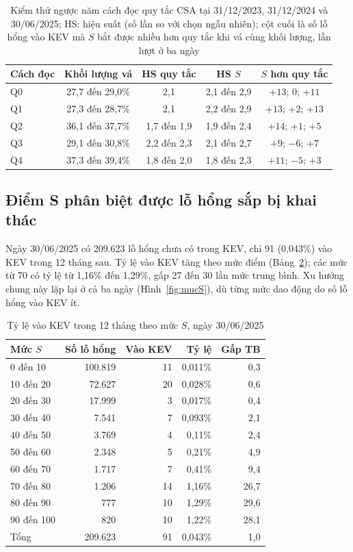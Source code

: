 \documentclass[conference]{IEEEtran}
\begin{document}
\begin{table}[htbp]
\caption{Kiểm thử ngược năm cách đọc quy tắc CSA tại 31/12/2023, 31/12/2024 và 30/06/2025; HS:
hiệu suất (số lần so với chọn ngẫu nhiên); cột cuối là số lỗ hổng vào KEV mà $S$ bắt được nhiều
hơn quy tắc khi vá cùng khối lượng, lần lượt ở ba ngày}\label{tab:donhay2}
\centering
\footnotesize
\setlength{\tabcolsep}{2.5pt}
\begin{tabular}{lcccc}
\toprule
Cách đọc & Khối lượng vá & HS quy tắc & HS $S$ & $S$ hơn quy tắc \\
\midrule
Q0 & 27,7 đến 29,0\% & 2,1 & 2,1 đến 2,9 & $+13$; $0$; $+11$ \\
Q1 & 27,3 đến 28,7\% & 2,1 & 2,2 đến 2,9 & $+13$; $+2$; $+13$ \\
Q2 & 36,1 đến 37,7\% & 1,7 đến 1,9 & 1,9 đến 2,4 & $+14$; $+1$; $+5$ \\
Q3 & 29,1 đến 30,8\% & 2,2 đến 2,3 & 2,1 đến 2,7 & $+9$; $-6$; $+7$ \\
Q4 & 37,3 đến 39,4\% & 1,8 đến 2,0 & 1,8 đến 2,3 & $+11$; $-5$; $+3$ \\
\bottomrule
\end{tabular}
\end{table}

\subsection{Điểm S phân biệt được lỗ hổng sắp bị khai thác}
Ngày 30/06/2025 có 209.623 lỗ hổng chưa có trong KEV, chỉ 91 (0,043\%) vào KEV trong 12 tháng sau.
Tỷ lệ vào KEV tăng theo mức điểm (Bảng~\ref{tab:mucS}); các mức từ 70 có tỷ lệ từ 1,16\% đến 1,29\%, gấp 27 đến 30 lần mức trung bình. Xu hướng chung này lặp lại ở cả ba ngày (Hình~\ref{fig:mucS}), dù từng mức
dao động do số lỗ hổng vào KEV ít.

\begin{table}[htbp]
\caption{Tỷ lệ vào KEV trong 12 tháng theo mức $S$, ngày 30/06/2025}\label{tab:mucS}
\centering
\begin{tabular}{lrrrr}
\toprule
Mức $S$ & Số lỗ hổng & Vào KEV & Tỷ lệ & Gấp TB \\
\midrule
0 đến 10   & 100.819 & 11 & 0,011\% & 0,3 \\
10 đến 20  & 72.627  & 20 & 0,028\% & 0,6 \\
20 đến 30  & 17.999  & 3  & 0,017\% & 0,4 \\
30 đến 40  & 7.541   & 7  & 0,093\% & 2,1 \\
40 đến 50  & 3.769   & 4  & 0,11\%  & 2,4 \\
50 đến 60  & 2.348   & 5  & 0,21\%  & 4,9 \\
60 đến 70  & 1.717   & 7  & 0,41\%  & 9,4 \\
70 đến 80  & 1.206   & 14 & 1,16\%  & 26,7 \\
80 đến 90  & 777     & 10 & 1,29\%  & 29,6 \\
90 đến 100 & 820     & 10 & 1,22\%  & 28,1 \\
\midrule
Tổng & 209.623 & 91 & 0,043\% & 1,0 \\
\bottomrule
\end{tabular}
\end{table}
\end{document}

